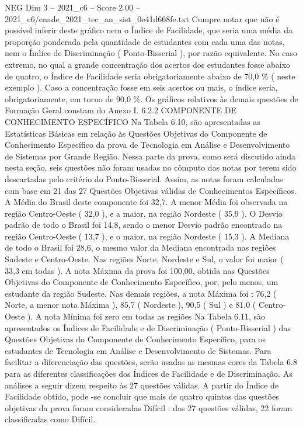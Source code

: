 \begin{textsample}{NEG Dim 3 – 2021\_c6 – Score 2.00 – 2021\_c6/enade\_2021\_tec\_an\_sist\_0e41d668fe.txt}
Cumpre notar que não é possível inferir deste gráfico nem o Índice de Facilidade, que seria uma média da proporção ponderada pela quantidade de estudantes com cada uma das notas, nem o Índice de Discriminação ( Ponto-Bisserial ), por razão equivalente.
No caso extremo, no qual a grande concentração dos acertos dos estudantes fosse abaixo de quatro, o Índice de Facilidade seria obrigatoriamente abaixo de 70,0 \% ( neste exemplo ).
Caso a concentração fosse em seis acertos ou mais, o índice seria, obrigatoriamente, em torno de 90,0 \%.
Os gráficos relativos às demais questões de Formação Geral constam do Anexo I. 6.2.2 COMPONENTE DE CONHECIMENTO ESPECÍFICO Na Tabela 6.10, são apresentadas as Estatísticas Básicas em relação às Questões Objetivas do Componente de Conhecimento Específico da prova de Tecnologia em Análise e Desenvolvimento de Sistemas por Grande Região.
Nessa parte da prova, como será discutido ainda nesta seção, seis questões não foram usadas no cômputo das notas por terem sido descartadas pelo critério do Ponto-Bisserial.
Assim, as notas foram calculadas com base em 21 das 27 Questões Objetivas válidas de Conhecimentos Específicos.
A Média do Brasil deste componente foi 32,7.
A menor Média foi observada na região Centro-Oeste ( 32,0 ), e a maior, na região Nordeste ( 35,9 ).
O Desvio padrão de todo o Brasil foi 14,8, sendo o menor Desvio padrão encontrado na região Centro-Oeste ( 13,7 ), e o maior, na região Nordeste ( 15,3 ).
A Mediana de todo o Brasil foi 28,6, o mesmo valor da Mediana encontrada nas regiões Sudeste e Centro-Oeste.
Nas regiões Norte, Nordeste e Sul, o valor foi maior ( 33,3 em todas ).
A nota Máxima da prova foi 100,00, obtida nas Questões Objetivas do Componente de Conhecimento Específico, por, pelo menos, um estudante da região Sudeste.
Nas demais regiões, a nota Máxima foi : 76,2 ( Norte, a menor nota Máxima ), 85,7 ( Nordeste ), 90,5 ( Sul ) e 81,0 ( Centro-Oeste ).
A nota Mínima foi zero em todas as regiões Na Tabela 6.11, são apresentados os Índices de Facilidade e de Discriminação ( Ponto-Bisserial ) das Questões Objetivas do Componente de Conhecimento Específico, para os estudantes de Tecnologia em Análise e Desenvolvimento de Sistemas.
Para facilitar a diferenciação das questões, serão usadas as mesmas cores da Tabela 6.8 para as diferentes classificações dos Índices de Facilidade e de Discriminação.
As análises a seguir dizem respeito às 27 questões válidas.
A partir do Índice de Facilidade obtido, pode -se concluir que mais de quatro quintos das questões objetivas da prova foram consideradas Difícil : das 27 questões válidas, 22 foram classificadas como Difícil.

\end{textsample}
